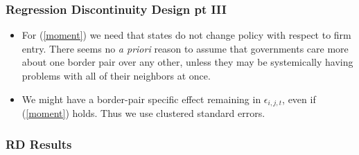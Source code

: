 \documentclass{beamer}
\begin{document}
\begin{frame}
\frametitle{Regression Discontinuity Design pt III}
\begin{itemize}
\item For (\ref{moment}) we need that states do not change policy with respect to firm entry. There seems no \textit{a priori} reason to assume that governments care more about one border pair over any other, unless they may be systemically having problems with all of their neighbors at once.
\item We might have a border-pair specific effect remaining in $\epsilon_{i,j,t}$, even if (\ref{moment}) holds. Thus we use clustered standard errors. 
\end{itemize}
\end{frame}


\begin{frame}
\frametitle{RD Results}
\begin{table}[!htbp] \centering 
{\tiny\renewcommand{\arraystretch}{.8}
}
\end{table}
\end{frame}
\end{document}
